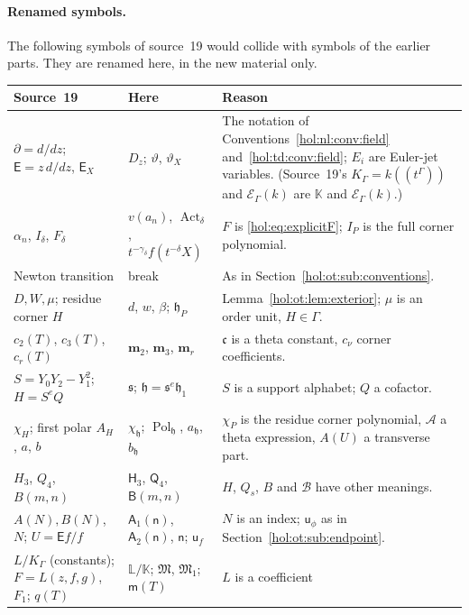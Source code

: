 \documentclass[11pt]{article}
\numberwithin{equation}{section}
\theoremstyle{definition}
\theoremstyle{remark}
\newcommand{\K}{K_\Gamma}
\newcommand{\KK}{\mathbb K}
\newcommand{\EK}{\mathcal E_\Gamma(k)}
\begin{document}
\paragraph{Renamed symbols.}
The following symbols of source~19 would collide with symbols of the earlier
parts. They are renamed here, in the new material only.
{\small
\begin{longtable}{@{}>{\raggedright\arraybackslash}p{}
>{\raggedright\arraybackslash}p{}
>{\raggedright\arraybackslash}p{}@{}}
\toprule
Source~19 & Here & Reason\\
\midrule
\endhead
$\partial=d/dz$; $\mathsf E=z\,d/dz$, $\mathsf E_X$ & $D_z$; $\vartheta$,
$\vartheta_X$ & The notation of Conventions~\ref{hol:nl:conv:field}
and~\ref{hol:td:conv:field}; $E_i$ are Euler-jet variables. (Source~19's
$\K=k((t^\Gamma))$ and $\mathcal E_\Gamma(k)$ are $\KK$ and $\EK$.)\\
$\alpha_n$, $I_\delta$, $F_\delta$ & $v(a_n)$, $\operatorname{Act}_\delta$,
$t^{-\gamma_\delta}f(t^{-\delta}X)$ & $F$ is \eqref{hol:eq:explicitF}; $I_P$
is the full corner polynomial.\\
Newton transition & break & As in Section~\ref{hol:ot:sub:conventions}.\\
$D,W,\mu$; residue corner $H$ & $d$, $w$, $\beta$; $\mathfrak h_P$ &
Lemma~\ref{hol:ot:lem:exterior}; $\mu$ is an order unit, $H\in\Gamma$.\\
$c_2(T)$, $c_3(T)$, $c_r(T)$ & $\mathbf m_2$, $\mathbf m_3$, $\mathbf m_r$ &
$\mathfrak c$ is a theta constant, $c_\nu$ corner coefficients.\\
$S=Y_0Y_2-Y_1^2$; $H=S^eQ$ & $\mathfrak s$; $\mathfrak h=\mathfrak s^e
\mathfrak h_1$ & $S$ is a support alphabet; $Q$ a cofactor.\\
$\chi_H$; first polar $A_H$, $a$, $b$ & $\chi_{\mathfrak h}$;
$\operatorname{Pol}_{\mathfrak h}$, $a_{\mathfrak h}$, $b_{\mathfrak h}$ &
$\chi_P$ is the residue corner polynomial, $\mathcal A$ a theta expression,
$A(U)$ a transverse part.\\
$H_3$, $Q_4$, $B(m,n)$ & $\mathsf H_3$, $\mathsf Q_4$, $\mathsf B(m,n)$ & $H$,
$Q_s$, $B$ and $\mathcal B$ have other meanings.\\
$A(N),B(N)$, $N$; $U=\mathsf Ef/f$ & $\mathsf A_1(\mathsf n)$,
$\mathsf A_2(\mathsf n)$, $\mathsf n$; $\mathsf u_f$ & $N$ is an index;
$\mathsf u_\phi$ as in Section~\ref{hol:ot:sub:endpoint}.\\
$L/\K$ (constants); $F=L(z,f,g)$, $F_1$; $q(T)$ & $\mathbb L/\KK$;
$\mathfrak M$, $\mathfrak M_1$; $\mathsf m(T)$ & $L$ is a coefficient

\end{longtable}}
\end{document}
